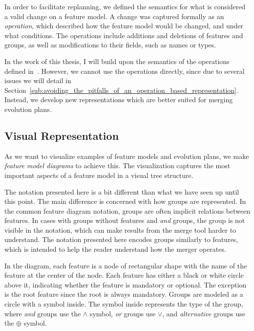 \documentclass[a4paper,english]{ifimaster}
\begin{document}
In order to facilitate replanning, we defined the semantics for what is considered a valid change on a feature model. A change was captured formally as an \textit{operation}, which described how the feature model would be changed, and under what conditions. The operations include additions and deletions of features and groups, as well as modifications to their fields, such as names or types.

In the work of this thesis, I will build upon the semantics of the operations defined in~\cite{cite:consistency_preserving_evolution_planning}. However, we cannot use the operations directly, since due to several issues we will detail in Section~\vref{sub:avoiding_the_pitfalls_of_an_operation_based_representation}. Instead, we develop new representations which are better suited for merging evolution plans.

\subsection{Visual Representation}%
\label{sub:visual_representation}

As we want to visualize examples of feature models and evolution plans, we make \textit{feature model diagrams} to achieve this. The visualization captures the most important aspects of a feature model in a visual tree structure. 

The notation presented here is a bit different than what we have seen up until this point. The main difference is concerned with how groups are represented. In the common feature diagram notation, groups are often implicit relations between features. In cases with groups without features and \textit{and} groups, the group is not visible in the notation, which can make results from the merge tool harder to understand. The notation presented here encodes groups similarly to features, which is intended to help the reader understand how the merger operates.

In the diagram, each feature is a node of rectangular shape with the name of the feature at the center of the node. Each feature has either a black or white circle above it, indicating whether the feature is mandatory or optional. The exception is the root feature since the root is always mandatory. Groups are modeled as a circle with a symbol inside. The symbol inside represents the type of the group, where \textit{and} groups use the $\land$ symbol, \textit{or} groups use $\lor$, and \textit{alternative} groups use the $\oplus$ symbol.
\end{document}
